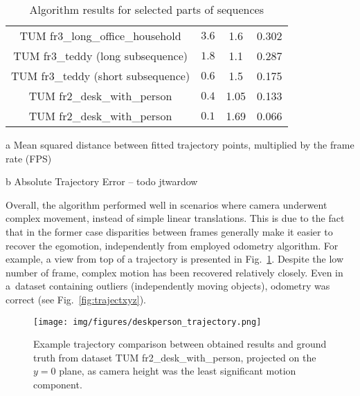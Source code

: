 \begin{table}[ht]
	\centering
	
	\begin{threeparttable}
		\caption{Algorithm results for selected parts of sequences}
		\label{tab:drift}
		
		\begin{tabularx}{0.9\textwidth}{C{0.5} C{0.2} C{0.15} C{0.15}}
			\toprule
			 &  &  & \\
			\midrule
			TUM fr3\_long\_office\_household & $3.6$ & 1.6 &  0.302 \\
			TUM fr3\_teddy (long subsequence) & $1.8$ & 1.1 & 0.287 \\
			TUM fr3\_teddy (short subsequence) & $0.6$ & 1.5 & 0.175 \\
			TUM fr2\_desk\_with\_person & $0.4$ & 1.05 & 0.133 \\
			TUM fr2\_desk\_with\_person & $0.1$ & 1.69 & 0.066 \\
			\bottomrule
		\end{tabularx}
		
		\begin{tablenotes}
			\footnotesize
			\item[a] Mean squared distance between fitted trajectory points, multiplied by the frame rate (FPS)
			\item[b] Absolute Trajectory Error -- todo jtwardow
		\end{tablenotes}
		
	\end{threeparttable}
\end{table}

Overall, the algorithm performed well in scenarios where camera underwent complex movement, instead of simple linear translations. This is due to the fact that in the former case disparities between frames generally make it easier to recover the egomotion, independently from employed odometry algorithm. For example, a view from top of a trajectory is presented in Fig.~\ref{fig:traject}. Despite the low number of frame, complex motion has been recovered relatively closely. Even in a~dataset containing outliers (independently moving objects), odometry was correct (see Fig.~\ref{fig:trajectxyz}).

\begin{figure}[ht]
	\centering\texttt{[image: img/figures/deskperson\_trajectory.png]}
	\caption{ Example trajectory comparison between obtained results and ground truth from dataset TUM fr2\_desk\_with\_person, projected on the $y=0$ plane, as camera height was the least significant motion component. }
	\label{fig:traject}
\end{figure}

